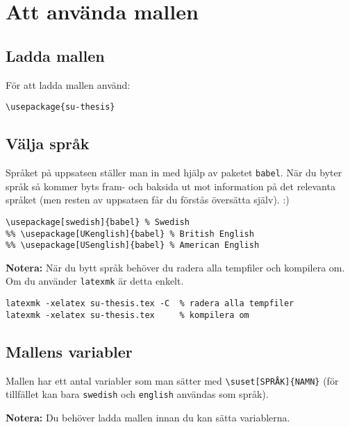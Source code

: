 
\section{Att använda mallen}
\label{mallen}


\subsection{Ladda mallen}
\label{variabler}

För att ladda mallen använd:

\begin{verbatim}
\usepackage{su-thesis}
\end{verbatim}


\subsection{Välja språk}
\label{sprak}

\noindent Språket på uppsatsen ställer man in med hjälp av paketet
\texttt{babel}. När du byter språk så kommer byts fram- och baksida ut mot
information på det relevanta språket (men resten av uppsatsen får du förstås
översätta själv). :)

\begin{verbatim}
\usepackage[swedish]{babel} % Swedish
%% \usepackage[UKenglish]{babel} % British English
%% \usepackage[USenglish]{babel} % American English
\end{verbatim}

\noindent\textbf{Notera:} När du bytt språk behöver du radera alla tempfiler
och kompilera om. Om du använder \texttt{latexmk} är detta enkelt.

\begin{verbatim}
latexmk -xelatex su-thesis.tex -C  % radera alla tempfiler
latexmk -xelatex su-thesis.tex     % kompilera om
\end{verbatim}


\subsection{Mallens variabler}
\label{variabler}

Mallen har ett antal variabler som man sätter med \verb|\suset[SPRÅK]{NAMN}|
(för tillfället kan bara \texttt{swedish} och \texttt{english} användas som
språk).

\textbf{Notera:} Du behöver ladda mallen innan du kan sätta variablerna.

